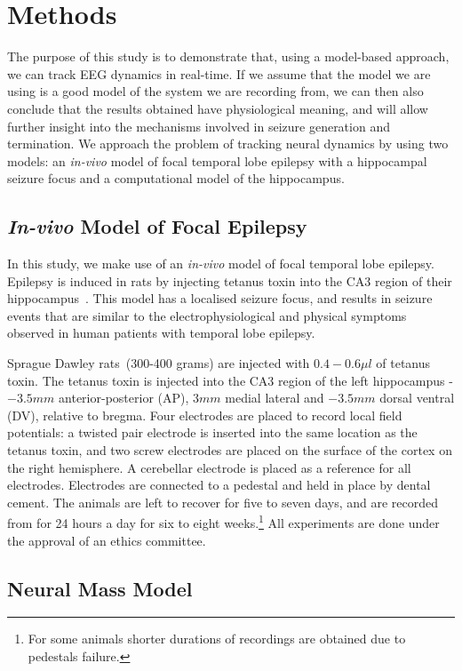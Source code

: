 \section{Methods}

The purpose of this study is to demonstrate that, using a model-based approach, we can track EEG dynamics in real-time. If we assume that the model we are using is a good model of the system we are recording from, we can then also conclude that the results obtained have physiological meaning, and will allow further insight into the mechanisms involved in seizure generation and termination. We approach the problem of tracking neural dynamics by using two models: an \textsl{in-vivo} model of focal temporal lobe epilepsy with a hippocampal seizure focus and a computational model of the hippocampus.

\subsection{\textsl{In-vivo} Model of Focal Epilepsy}

In this study, we make use of an \textsl{in-vivo} model of focal temporal lobe epilepsy. Epilepsy is induced in rats by injecting tetanus toxin into the CA3 region of their hippocampus~\citep{jefferys1995chronic}. This model has a localised seizure focus, and results in seizure events that are similar to the electrophysiological and physical symptoms observed in human patients with temporal lobe epilepsy. 

Sprague Dawley rats~(300-400 grams) are injected with $0.4-0.6\mu l$ of tetanus toxin. The tetanus toxin is injected into the CA3 region of the left hippocampus - $-3.5mm$ anterior-posterior (AP), $3mm$ medial lateral and $-3.5mm$ dorsal ventral (DV), relative to bregma. Four electrodes are placed to record local field potentials: a twisted pair electrode is inserted into the same location as the tetanus toxin, and two screw electrodes are placed on the surface of the cortex on the right hemisphere. A cerebellar electrode is placed as a reference for all electrodes. Electrodes are connected to a pedestal and held in place by dental cement. The animals are left to recover for five to seven days, and are recorded from for 24 hours a day for six to eight weeks.\footnote{For some animals shorter durations of recordings are obtained due to pedestals failure.} All experiments are done under the approval of an ethics committee.

\subsection{Neural Mass Model} 

